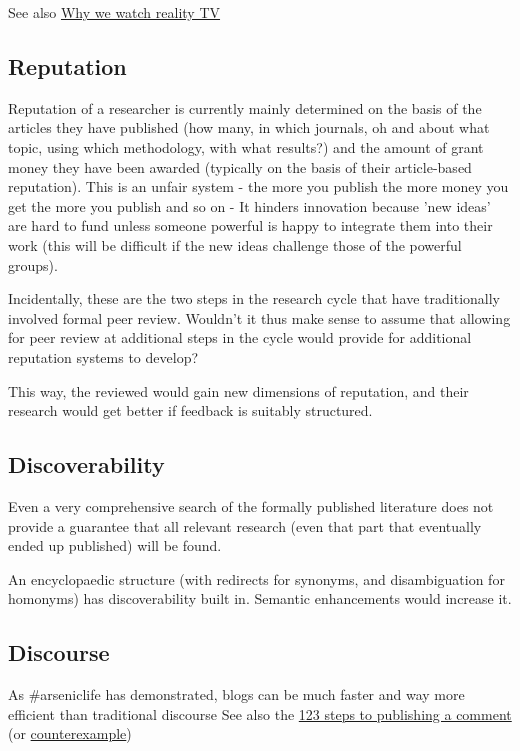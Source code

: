 \documentclass[final,authoryear,3p]{elsarticle-open-drafting}
\begin{document}
See also \href{http://psych-your-mind.blogspot.com/2011/06/why-we-watch-reality-tv.html}{Why we watch reality TV}

\subsection{Reputation}
Reputation of a researcher is currently mainly determined on the basis of the articles they have published (how many, in which 
journals, oh and about what topic, using which methodology, with what results?) and the amount of grant money they have been
awarded (typically on the basis of their article-based reputation). This is an unfair system - the more you publish the more money you get the more you publish and so on - It hinders innovation because 'new ideas' are hard to fund unless someone powerful is happy to integrate them into their work (this will be difficult if the new ideas challenge those of the powerful groups). 

Incidentally, these are the two steps in the research cycle that have traditionally involved formal peer review. Wouldn't it thus make sense to assume that allowing for peer review at additional steps in the cycle would provide for additional reputation systems to develop?

This way, the reviewed would gain new dimensions of reputation, and their research would get better if feedback is suitably structured.

\subsection{Discoverability}
Even a very comprehensive search of the formally published literature does not provide a guarantee that all relevant research (even that part that eventually ended up published) will be found. 

An encyclopaedic structure (with redirects for synonyms, and disambiguation for homonyms) has discoverability built in. Semantic enhancements would increase it.

\subsection{Discourse}
As \#arseniclife has demonstrated, blogs can be much faster and way more efficient than traditional discourse
See also the \href{http://scienceblogs.com/catdynamics/2009/08/how_to_publish_a_scientific_co.php}{123 steps to publishing a comment} (or \href{http://slawekk.wordpress.com/2010/05/21/how-to-publish-counterexamples-in-1-2-3-easy-steps/}{counterexample})
\end{document}

